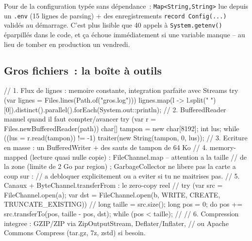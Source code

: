 \documentclass[12pt,a4paper,twoside,openright]{book}
\begin{document}
\begin{astuce}
Pour de la configuration typ\'ee sans d\'ependance~: \verb|Map<String,String>| lue depuis un
\verb|.env| (15 lignes de parsing) + des enregistrements \verb|record Config(...) | valid\'es au
d\'emarrage. C'est plus lisible que 40 appels \`a \verb|System.getenv()| \'eparpill\'es dans le code, et
\c{c}a \'echoue imm\'ediatement si une variable manque -- au lieu de tomber en production un vendredi.
\end{astuce}

\subsection{Gros fichiers~: la bo\^ite \`a outils}

\begin{codejava}
// 1. Flux de lignes : memoire constante, integration parfaite avec Streams
try (var lignes = Files.lines(Path.of("gros.log"))) {
    lignes.map(l -> l.split(" ")[0]).distinct().parallel().forEach(System.out::println);
}
// 2. BufferedReader manuel quand il faut compter/avancer
try (var r = Files.newBufferedReader(path)) {
    char[] tampon = new char[8192];
    int lus;
    while ((lus = r.read(tampon)) != -1) { traiter(new String(tampon, 0, lus)); }
}
// 3. Ecriture en masse : un BufferedWriter + des sauts de tampon de 64 Ko
// 4. memory-mapped (lecture quasi nulle copie) : FileChannel.map -- attention a la taille
//    de la zone (limite de 2 Go par region) ; GarbageCollector ne libere pas la carte a coup sur :
//    a debloquer explicitement ou a eviter si tu ne maitrises pas.
// 5. Canaux + ByteChannel.transferFrom : le zero-copy reel
//    try (var src = FileChannel.open(a); var dst = FileChannel.open(b, WRITE, CREATE, TRUNCATE_EXISTING)) {
//        long taille = src.size(); long pos = 0; do { pos += src.transferTo(pos, taille - pos, dst); } while (pos < taille);
//    }
// 6. Compression integree : GZIP/ZIP via ZipOutputStream, Deflater/Inflater,
//    ou Apache Commons Compress (tar.gz, 7z, zstd) si besoin.
\end{codejava}
\end{document}
